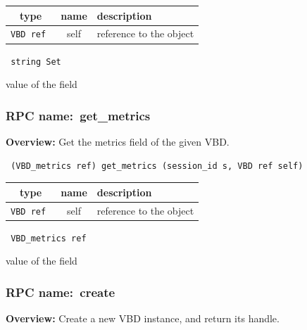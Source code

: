  
\vspace{0.3cm}
\begin{tabular}{|c|c|p{7cm}|}
 \hline
{\bf type} & {\bf name} & {\bf description} \\ \hline
{\tt VBD ref } & self & reference to the object \\ \hline 

\end{tabular}

\vspace{0.3cm}

{\tt 
string Set
}


value of the field
\vspace{0.3cm}
\vspace{0.3cm}
\vspace{0.3cm}
\subsubsection{RPC name:~get\_metrics}

{\bf Overview:} 
Get the metrics field of the given VBD.

\begin{verbatim} (VBD_metrics ref) get_metrics (session_id s, VBD ref self)\end{verbatim}



 
\vspace{0.3cm}
\begin{tabular}{|c|c|p{7cm}|}
 \hline
{\bf type} & {\bf name} & {\bf description} \\ \hline
{\tt VBD ref } & self & reference to the object \\ \hline 

\end{tabular}

\vspace{0.3cm}

{\tt 
VBD\_metrics ref
}


value of the field
\vspace{0.3cm}
\vspace{0.3cm}
\vspace{0.3cm}
\subsubsection{RPC name:~create}

{\bf Overview:} 
Create a new VBD instance, and return its handle.

